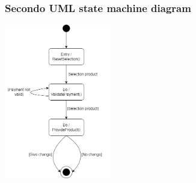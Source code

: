 \documentclass{article}
\begin{document}
\subsubsection*{Secondo UML state machine diagram}
\large
\begin{center}
    \includegraphics[width=0.35\textwidth]{foto 8.png}    
\end{center}
\end{document}
